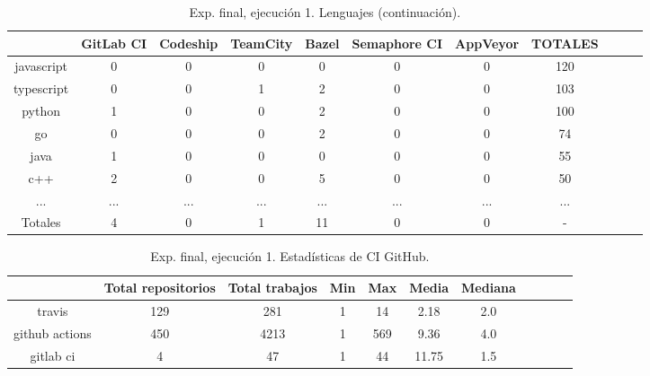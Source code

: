 \begin{table}
  \centering
  \caption{Exp. final, ejecución 1. Lenguajes (continuación).}
  \label{tab:tabla_f1_2b}

\begin{footnotesize}
\renewcommand{\arraystretch}{1.5} %
\begin{tabular}{ccccccccccc}
  \hline
  {} &  GitLab CI &  Codeship &  TeamCity &  Bazel &  Semaphore CI &  AppVeyor &  TOTALES \\
  \hline
  javascript       &        0 &         0 &         0 &      0 &             0 &         0 &    120 \\
  typescript       &        0 &         0 &         1 &      2 &             0 &         0 &    103 \\
  python           &        1 &         0 &         0 &      2 &             0 &         0 &    100 \\
  go               &        0 &         0 &         0 &      2 &             0 &         0 &     74 \\
  java             &        1 &         0 &         0 &      0 &             0 &         0 &     55 \\
  c++              &        2 &         0 &         0 &      5 &             0 &         0 &     50 \\
  ...              &      ... &       ... &       ... &    ... &           ... &       ... &    ... \\
  \hline
  Totales          &        4 &         0 &         1 &     11 &             0 &         0 &      - \\
 \end{tabular}
\end{footnotesize}

\end{table}

\begin{table}
  \centering
  \caption{Exp. final, ejecución 1. Estadísticas de CI GitHub.}
  \label{tab:tabla_f1_3}

\begin{footnotesize}
\renewcommand{\arraystretch}{1.5} %
\begin{tabular}{ccccccccccc}
  \hline
  {} &  Total repositorios &  Total trabajos &  Min &  Max &  Media &  Mediana \\
  \hline
  travis         &        129 &         281 &    1 &   14 &   2.18 &      2.0 \\
  github actions &        450 &        4213 &    1 &  569 &   9.36 &      4.0 \\
  gitlab ci      &          4 &          47 &    1 &   44 &  11.75 &      1.5 \\
 \end{tabular}
\end{footnotesize}

\end{table}

